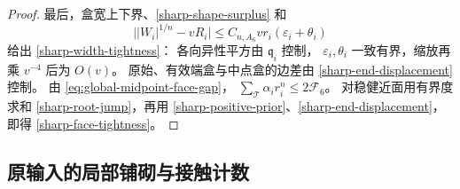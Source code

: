 \begin{proof}
最后，盒宽上下界、\eqref{sharp-shape-surplus} 和
\[
 \bigl||W_i|^{1/n}-vR_i\bigr|
 \le C_{n,A_6}vr_i(\varepsilon_i+\theta_i)
\]
给出 \eqref{sharp-width-tightness}：
各向异性平方由 \(\mathfrak q_i\) 控制，
\(\varepsilon_i,\theta_i\) 一致有界，缩放再乘 \(v^{-4}\) 后为 \(O(v)\)。
原始、有效端盒与中点盒的边差由
\eqref{sharp-end-displacement} 控制。
由 \eqref{eq:global-midpoint-face-gap}，
\(\sum_{\mathcal T}\alpha_i r_i^n\le2\mathcal F_6\)。
对稳健近面用有界度求和
\eqref{sharp-root-jump}，再用
\eqref{sharp-positive-prior}、\eqref{sharp-end-displacement}，
即得 \eqref{sharp-face-tightness}。
\end{proof}

\subsection{原输入的局部铺砌与接触计数}

